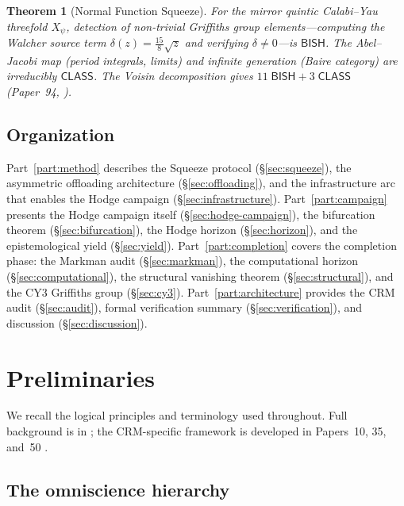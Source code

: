 \documentclass[11pt]{article}
\theoremstyle{plain}
\newtheorem{theorem}{Theorem}[section]
\theoremstyle{definition}
\theoremstyle{remark}
\newcommand{\BISH}{\mathsf{BISH}}
\newcommand{\CLASS}{\mathsf{CLASS}}
\begin{document}
\begin{theorem}[Normal Function Squeeze]\label{thm:F}
For the mirror quintic Calabi--Yau threefold $X_\psi$, detection of
non-trivial Griffiths group elements---computing the Walcher source
term $\delta(z) = \tfrac{15}{8}\sqrt{z}$ and verifying $\delta \neq 0$---is
$\BISH$.  The Abel--Jacobi map (period integrals, limits) and infinite
generation (Baire category) are irreducibly $\CLASS$.  The Voisin
decomposition gives $11\;\BISH + 3\;\CLASS$ (Paper~94, \cite{p94}).
\end{theorem}


\subsection{Organization}

Part~\ref{part:method} describes the Squeeze protocol
(\S\ref{sec:squeeze}), the asymmetric offloading architecture
(\S\ref{sec:offloading}), and the infrastructure arc that
enables the Hodge campaign (\S\ref{sec:infrastructure}).
Part~\ref{part:campaign} presents the Hodge campaign itself
(\S\ref{sec:hodge-campaign}), the bifurcation theorem
(\S\ref{sec:bifurcation}), the Hodge horizon
(\S\ref{sec:horizon}), and the epistemological yield
(\S\ref{sec:yield}).  Part~\ref{part:completion} covers the
completion phase: the Markman audit (\S\ref{sec:markman}),
the computational horizon (\S\ref{sec:computational}),
the structural vanishing theorem (\S\ref{sec:structural}),
and the CY3 Griffiths group (\S\ref{sec:cy3}).
Part~\ref{part:architecture} provides the CRM audit
(\S\ref{sec:audit}), formal verification summary
(\S\ref{sec:verification}), and discussion (\S\ref{sec:discussion}).


\section{Preliminaries}\label{sec:prelim}

We recall the logical principles and terminology used throughout.
Full background is in \cite{bridges-richman,bishop-bridges}; the
CRM-specific framework is developed in Papers~10, 35, and~50
\cite{p10,p35,p50}.

\subsection{The omniscience hierarchy}
\end{document}
